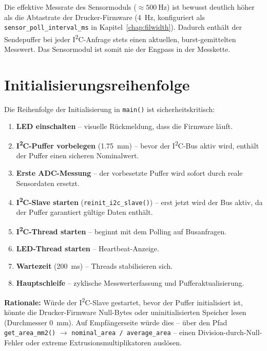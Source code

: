 Die effektive Messrate des Sensormoduls ($\approx \qty{500}{\hertz}$) ist bewusst deutlich höher als die Abtastrate der Drucker-Firmware (\qty{4}{\hertz}, konfiguriert als \texttt{sensor\_poll\_interval\_ms} in Kapitel~\ref{chap:filwidth}).
Dadurch enthält der Sendepuffer bei jeder I\textsuperscript{2}C-Anfrage stets einen aktuellen, burst-gemittelten Messwert.
Das Sensormodul ist somit nie der Engpass in der Messkette.

\section{Initialisierungsreihenfolge}
\label{sec:sensor_init}

Die Reihenfolge der Initialisierung in \texttt{main()} ist sicherheitskritisch:

\begin{enumerate}
  \item \textbf{LED einschalten} -- visuelle Rückmeldung, dass die Firmware läuft.
  \item \textbf{I\textsuperscript{2}C-Puffer vorbelegen} (\qty{1,75}{\milli\meter}) -- bevor der I\textsuperscript{2}C-Bus aktiv wird, enthält der Puffer einen sicheren Nominalwert.
  \item \textbf{Erste ADC-Messung} -- der vorbesetzte Puffer wird sofort durch reale Sensordaten ersetzt.
  \item \textbf{I\textsuperscript{2}C-Slave starten} (\texttt{reinit\_i2c\_slave()}) -- erst jetzt wird der Bus aktiv, da der Puffer garantiert gültige Daten enthält.
  \item \textbf{I\textsuperscript{2}C-Thread starten} -- beginnt mit dem Polling auf Busanfragen.
  \item \textbf{LED-Thread starten} -- Heartbeat-Anzeige.
  \item \textbf{Wartezeit} (\qty{200}{\milli\second}) -- Threads stabilisieren sich.
  \item \textbf{Hauptschleife} -- zyklische Messwerterfassung und Pufferaktualisierung.
\end{enumerate}

\textbf{Rationale:} Würde der I\textsuperscript{2}C-Slave gestartet, bevor der Puffer initialisiert ist, könnte die Drucker-Firmware Null-Bytes oder uninitialisierten Speicher lesen (Durchmesser \qty{0}{\milli\meter}).
Auf Empfängerseite würde dies -- über den Pfad \texttt{get\_area\_mm2()} $\rightarrow$ \texttt{nominal\_area / average\_area} -- einen Division-durch-Null-Fehler oder extreme Extrusionsmultiplikatoren auslösen.

